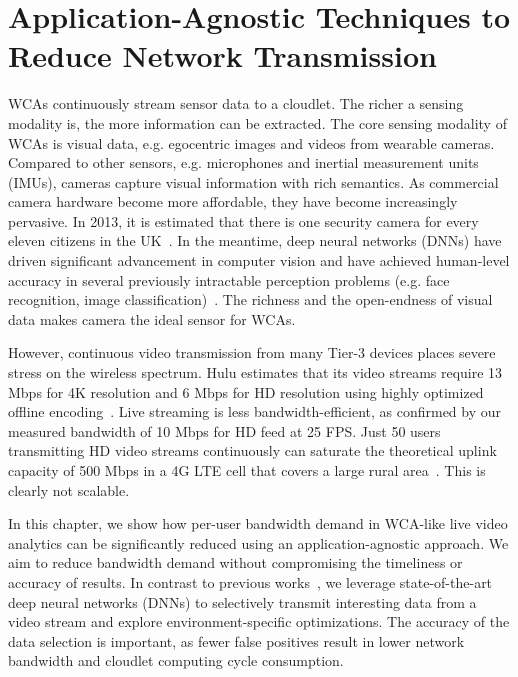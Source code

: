 \chapter{Application-Agnostic Techniques to Reduce Network Transmission}
\label{chapter: bandwidth}

WCAs continuously stream sensor data to a cloudlet. The richer a sensing
modality is, the more information can be extracted. The core sensing modality of
WCAs is visual data, e.g. egocentric images and videos from wearable cameras.
Compared to other sensors, e.g. microphones and inertial measurement units
(IMUs), cameras capture visual information with rich semantics. As commercial
camera hardware become more affordable, they have become increasingly pervasive.
In 2013, it is estimated that there is one security camera for every eleven
citizens in the UK~\cite{Barrett2013}. In the meantime, deep neural networks
(DNNs) have driven significant advancement in computer vision and have achieved
human-level accuracy in several previously intractable perception problems (e.g.
face recognition, image classification)~\cite{learned2016labeled,
    schroff2015facenet}. The richness and the open-endness of visual data makes
camera the ideal sensor for WCAs.

However, continuous video transmission from many Tier-3 devices places severe
stress on the wireless spectrum.  Hulu estimates that its video streams require
13 Mbps for 4K resolution and 6 Mbps for HD resolution using highly optimized
offline encoding~\cite{Hulu2017}. Live streaming is less bandwidth-efficient, as
confirmed by our measured bandwidth of 10 Mbps for HD feed at 25 FPS. Just 50
users transmitting HD video streams continuously can saturate the theoretical
uplink capacity of 500 Mbps in a 4G LTE cell that covers a large rural
area~\cite{LteWorld2009}.  This is clearly not scalable.

In this chapter, we show how per-user bandwidth demand in WCA-like live video
analytics can be significantly reduced using an application-agnostic approach.
We aim to reduce bandwidth demand without compromising the timeliness or
accuracy of results. In contrast to previous
works~\cite{Wang2017networked,zhang2015design,Wang2016skyeyes}, we leverage
state-of-the-art deep neural networks (DNNs) to selectively transmit interesting
data from a video stream and explore environment-specific optimizations. The
accuracy of the data selection is important, as fewer false positives result in
lower network bandwidth and cloudlet computing cycle consumption.

